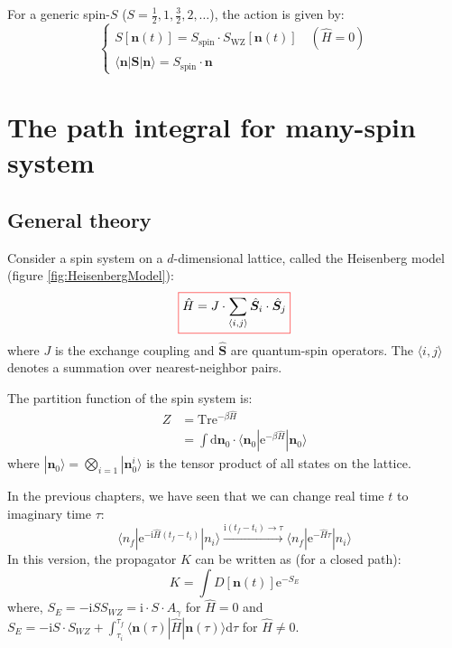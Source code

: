 \begin{theorem}
    For a generic spin-$S$ ($S=\frac{1}{2}, 1, \frac{3}{2}, 2, \dots$), the action is given by:
    \begin{equation}
    \begin{cases}
    S[\bm{n}(t)] = S_{\mathrm{spin}} \cdot S_{\mathrm{WZ}}[\bm{n}(t)] \quad (\hat{H}=0) \\
    \langle \bm{n} | \bm{S} | \bm{n} \rangle = S_{\mathrm{spin}} \cdot \bm{n}
    \end{cases}
    \end{equation}

\end{theorem}

\chapter{The path integral for many-spin system}

\section{General theory}

Consider a spin system on a $d$-dimensional lattice, called the Heisenberg model (figure \ref{fig:HeisenbergModel}):
\begin{equation}
    \colorboxed{
    \hat{H} = J \cdot \sum_{\langle i,j \rangle} \hat{\bm{S}}_i \cdot \hat{\bm{S}}_j
    }
\end{equation}
where $J$ is the exchange coupling and $\hat{\bm{S}}$ are quantum-spin operators.
The $\langle i,j \rangle$ denotes a summation over nearest-neighbor pairs.



The partition function of the spin system is:
\begin{equation}
\begin{aligned}
Z &= \mathrm{Tr} \mathrm{e}^{-\beta \hat{H}} \\
&= \int \mathrm{d}\bm{n}_0 \cdot \langle \bm{n}_0 | \mathrm{e}^{-\beta \hat{H}} | \bm{n}_0 \rangle
\end{aligned}
\end{equation}
where
$|\bm{n}_0 \rangle = \bigotimes_{i=1} |\bm{n}_0^i \rangle$ is the tensor product of all states on the lattice.

In the previous chapters, we have seen that we can change real time $t$ to imaginary time $\tau$:
\begin{equation}
\langle n_f | \mathrm{e}^{-\mathrm{i}\hat{H}(t_f-t_i)} | n_i \rangle \xrightarrow{\mathrm{i}(t_f-t_i) \to \tau} \langle n_f | \mathrm{e}^{-\hat{H}\tau} | n_i \rangle
\end{equation}
In this version, the propagator $K$ can be written as (for a closed path):
\begin{equation}
K = \int D[\bm{n}(t)] \mathrm{e}^{-S_E}
\end{equation}
where, $S_E = -\mathrm{i} S S_{WZ} = \mathrm{i} \cdot S \cdot A_\gamma$ for $\hat{H}=0$ and
$S_E = -\mathrm{i} S \cdot S_{WZ} + \int_{\tau_i}^{\tau_f} \langle \bm{n}(\tau) | \hat{H} | \bm{n}(\tau) \rangle \mathrm{d}\tau$ for $\hat{H} \neq 0$.


